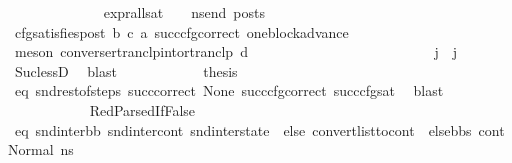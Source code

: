 \begin{isabellebody}
\ \ \ \ \ \ \ \ \ \ \ \ \isamarkupfalse%
\ {\isachardoublequoteopen}{\isacharparenleft}{\kern0pt}expr{\isacharunderscore}{\kern0pt}all{\isacharunderscore}{\kern0pt}sat\ {\isasymLambda}\ {\isasymGamma}\ {\isasymOmega}\ ns{\isacharunderscore}{\kern0pt}end{\isacharparenright}{\kern0pt}\ posts{\isachardoublequoteclose}\ \isamarkupfalse%
\ cfg{\isacharunderscore}{\kern0pt}satisfies{\isacharunderscore}{\kern0pt}post\ b\ c\ a\ succ{\isacharunderscore}{\kern0pt}cfg{\isacharunderscore}{\kern0pt}correct\ one{\isacharunderscore}{\kern0pt}block{\isacharunderscore}{\kern0pt}advance\ \isanewline
\ \ \ \ \ \ \ \ \ \ \ \ \ \ \isamarkupfalse%
\ {\isacharparenleft}{\kern0pt}meson\ converse{\isacharunderscore}{\kern0pt}rtranclp{\isacharunderscore}{\kern0pt}into{\isacharunderscore}{\kern0pt}rtranclp\ d{\isacharparenright}{\kern0pt}\ \isanewline
\ \ \ \ \ \ \ \ \ \ \isamarkupfalse%
\ \ \isanewline
\ \ \ \ \ \ \ \ \ \ \isamarkupfalse%
\ {\isachardoublequoteopen}j{\isacharprime}{\kern0pt}\ {\isacharless}{\kern0pt}\ j{\isachardoublequoteclose}\ \isamarkupfalse%
\ {}\ \isamarkupfalse%
\ Suc{\isacharunderscore}{\kern0pt}lessD\ \isamarkupfalse%
\ blast\isanewline
\ \ \ \ \ \ \ \ \ \ \isamarkupfalse%
\ {\isacharquery}{\kern0pt}thesis\ \isamarkupfalse%
\ eq\ snd{\isacharunderscore}{\kern0pt}rest{\isacharunderscore}{\kern0pt}of{\isacharunderscore}{\kern0pt}steps\ succ{\isacharunderscore}{\kern0pt}correct\ None\ succ{\isacharunderscore}{\kern0pt}cfg{\isacharunderscore}{\kern0pt}correct\ succ{\isacharunderscore}{\kern0pt}cfg{\isacharunderscore}{\kern0pt}sat\ \isamarkupfalse%
\ blast\isanewline
\ \ \ \ \ \ \ \ \isamarkupfalse%
\isanewline
\ \ \ \ \ \ \ \ \ \ \isamarkupfalse%
\ {\isacharparenleft}{\kern0pt}RedParsedIfFalse{\isacharparenright}{\kern0pt}\isanewline
\ \ \ \ \ \ \ \ \ \ \isamarkupfalse%
\ eq{\isacharcolon}{\kern0pt}\ {\isachardoublequoteopen}{\isacharparenleft}{\kern0pt}snd{\isacharunderscore}{\kern0pt}inter{\isacharunderscore}{\kern0pt}bb{\isacharcomma}{\kern0pt}\ snd{\isacharunderscore}{\kern0pt}inter{\isacharunderscore}{\kern0pt}cont{\isacharcomma}{\kern0pt}\ snd{\isacharunderscore}{\kern0pt}inter{\isacharunderscore}{\kern0pt}state{\isacharparenright}{\kern0pt}\ {\isacharequal}{\kern0pt}\ {\isacharparenleft}{\kern0pt}else{}{\isacharcomma}{\kern0pt}\ convert{\isacharunderscore}{\kern0pt}list{\isacharunderscore}{\kern0pt}to{\isacharunderscore}{\kern0pt}cont\ {\isacharparenleft}{\kern0pt}\ else{\isacharunderscore}{\kern0pt}bbs{\isacharparenright}{\kern0pt}\ cont{}{\isacharcomma}{\kern0pt}\ Normal\ ns{}{\isacharparenright}{\kern0pt}{\isachardoublequoteclose}\ \isamarkupfalse%

\end{isabellebody}
